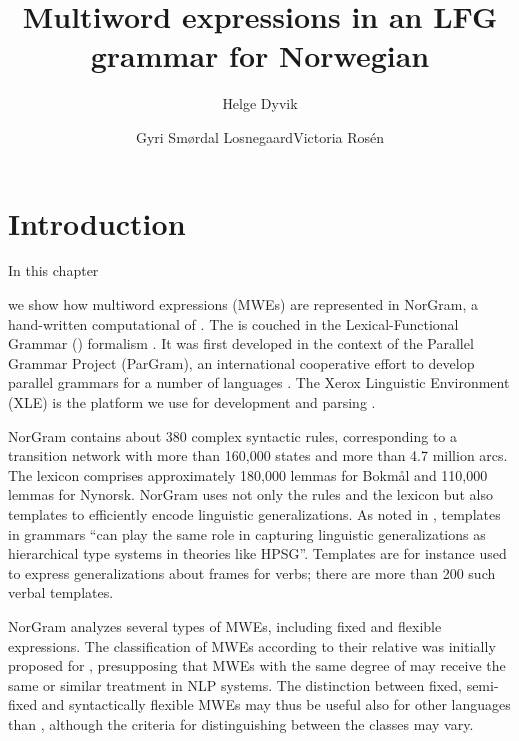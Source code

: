 \documentclass[output=paper]{langsci/langscibook}
\title{Multiword expressions in an {LFG} grammar for {N}orwegian}
\author{Helge Dyvik\affiliation{University of Bergen}\and Gyri Smørdal Losnegaard\affiliation{University of Bergen}\lastand Victoria Rosén\affiliation{University of Bergen}}
\begin{document}
\section{Introduction}\label{dyv:sec:intro}

%
%

In this chapter\addtocounter{footnote}{1} we show how multiword expressions (MWEs) are represented in NorGram, a hand-written computational  of  \citep{dyvik00en}. 
The  is couched in the Lexical-Functional Grammar () formalism \citep{bresnanlfs,dalrymplelfg}.
It was first developed in the context of the Parallel Grammar Project (ParGram), an international cooperative effort to develop parallel  grammars for a number of languages \citep{pargram02}.
The Xerox Linguistic Environment (XLE) is the platform we use for  development and parsing \citep{maxwell93}.

NorGram contains about 380 complex syntactic rules, corresponding to a transition network with more than 160,000 states and more than 4.7 million arcs.
The lexicon comprises approximately 180,000 lemmas for  Bokmål and 110,000 lemmas for  Nynorsk.
NorGram uses not only the  rules and the lexicon but also templates to efficiently encode linguistic generalizations.
As noted in \citet[207]{dalrymple04}, templates in  grammars “can play the same role in capturing linguistic generalizations as hierarchical type systems in theories like HPSG”.
Templates are for instance used to express generalizations about  frames for verbs; there are more than 200 such verbal templates.  

NorGram analyzes several types of MWEs, including fixed and flexible expressions.
The classification of MWEs according to their relative  was initially proposed for  \citep{sag02, baldwin10}, presupposing that MWEs with the same degree of  may receive the same or similar treatment in NLP systems.
The distinction between fixed, semi-fixed and syntactically flexible MWEs may thus be useful also for other languages than , although the criteria for distinguishing between the classes may vary.
\end{document}
